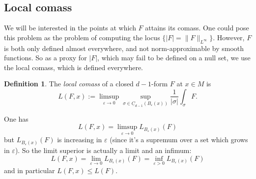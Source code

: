 \documentclass[reqno,11pt]{amsart}
\newcommand{\RR}{\mathbf{R}}
\newcommand{\Chain}{\underline C}
\newcommand{\dfn}[1]{\emph{#1}\index{#1}}
\theoremstyle{definition}
\newtheorem{definition}[theorem]{Definition}
\numberwithin{equation}{section}
\begin{document}
\subsection{Local comass}
We will be interested in the points at which $F$ attains its comass.
One could pose this problem as the problem of computing the locus $\{|F| = \|F\|_{L^\infty}\}$.
However, $F$ is both only defined almost everywhere, and not norm-approximable by smooth functions.
So as a proxy for $|F|$, which may fail to be defined on a null set, we use the local comass, which is defined everywhere.

\begin{definition}
The \dfn{local comass} of a closed $d - 1$-form $F$ at $x \in M$ is 
$$L(F, x) := \limsup_{\varepsilon \to 0} \sup_{\sigma \in \Chain_{d - 1}(B_\varepsilon(x))} \frac{1}{|\sigma|} \int_\sigma F.$$
\end{definition}

One has
$$L(F, x) = \limsup_{\varepsilon \to 0} L_{B_\varepsilon(x)}(F)$$
but $L_{B_\varepsilon(x)}(F)$ is increasing in $\varepsilon$ (since it's a supremum over a set which grows in $\varepsilon$).
So the limit superior is actually a limit and an infimum:
$$L(F, x) = \lim_{\varepsilon \to 0} L_{B_\varepsilon(x)}(F) = \inf_{\varepsilon > 0} L_{B_\varepsilon(x)}(F)$$
and in particular $L(F, x) \leq L(F)$.


\end{document}
